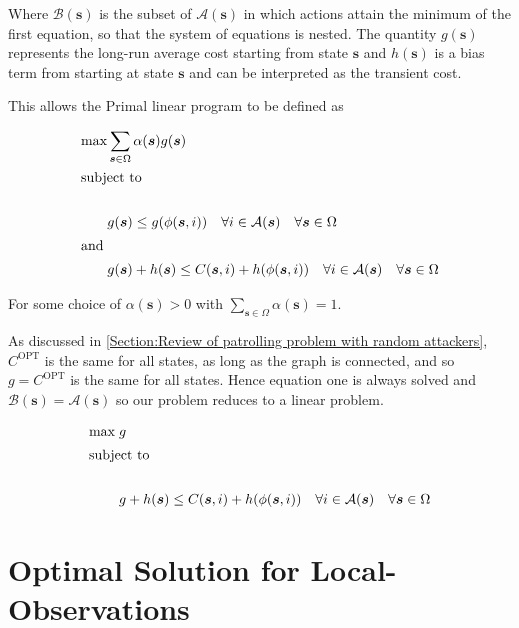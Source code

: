 \documentclass[a4paper,10pt]{article}
\theoremstyle{definition}
\theoremstyle{definition}
\theoremstyle{remark}
\theoremstyle{definition}
\begin{document}
Where $\mathcal{B}(\bm{s})$ is the subset of $\mathcal{A}(\bm{s})$ in which actions attain the minimum of the first equation, so that the system of equations is nested. The quantity $g(\bm{s})$ represents the long-run average cost starting from state $\bm{s}$ and $h(\bm{s})$ is a bias term from starting at state $\bm{s}$ and can be interpreted as the transient cost.

This allows the Primal linear program to be defined as

\begin{align*}
\max &\sum\limits_{\bm{s} \in \Omega} \alpha(\bm{s})g(\bm{s}) \\
\intertext{subject to} \\
&g(\bm{s}) \leq g(\phi(\bm{s},i))  \quad \forall i \in \mathcal{A}(\bm{s}) \quad \forall \bm{s} \in \Omega \\
\intertext{and}
&g(\bm{s})+h(\bm{s}) \leq C(\bm{s},i) + h(\phi(\bm{s},i)) \quad \forall i \in \mathcal{A}(\bm{s}) \quad \forall \bm{s} \in \Omega
\end{align*}

For some choice of $\alpha(\bm{s}) >0$ with $\sum\limits_{\bm{s} \in \Omega} \alpha(\bm{s}) = 1 $.

As discussed in \ref{Section:Review of patrolling problem with random attackers}, $C^{\text{OPT}}$ is the same for all states, as long as the graph is connected, and so $g=C^{\text{OPT}}$ is the same for all states. Hence equation one is always solved and $\mathcal{B}(\bm{s})=\mathcal{A}(\bm{s})$ so our problem reduces to a linear problem.

\begin{align*}
\max  \;  &g \\
\intertext{subject to} \\
&g+h(\bm{s}) \leq C(\bm{s},i) + h(\phi(\bm{s},i)) \quad \forall i \in \mathcal{A}(\bm{s}) \quad \forall \bm{s} \in \Omega
\end{align*}


\section{Optimal Solution for Local-Observations}
\label{Appendix:Optimal Solution for Random Attacker with Local-Observations}
\end{document}
